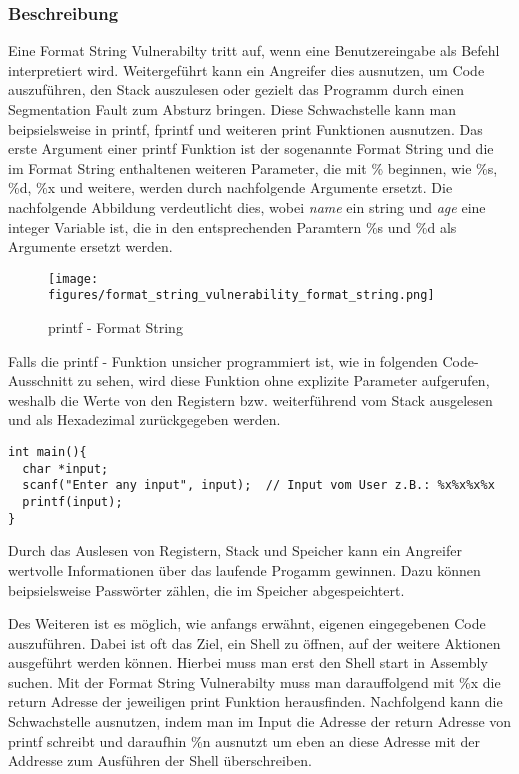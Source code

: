 \documentclass[a4paper,
DIV=13,
12pt,
BCOR=10mm,
department=FakIM,
oneside,
parskip=half,
automark,
listof=totocnumbered,
bibliography=totocnumbered,
acronym=totocnumbered
] {OTHRartcl}
\begin{document}
\subsubsection{Beschreibung}
Eine Format String Vulnerabilty tritt auf, wenn eine Benutzereingabe als Befehl interpretiert wird.
Weitergeführt kann ein Angreifer dies ausnutzen, um Code auszuführen, den Stack auszulesen oder gezielt das Programm durch einen Segmentation Fault zum Absturz bringen.
Diese Schwachstelle kann man beipsielsweise in printf, fprintf und weiteren print Funktionen ausnutzen.
Das erste Argument einer printf Funktion ist der sogenannte Format String und die im Format String enthaltenen weiteren Parameter, die mit \% beginnen, wie \%s, \%d, \%x und weitere, werden durch nachfolgende
Argumente ersetzt. Die nachfolgende Abbildung verdeutlicht dies, wobei \textit{name} ein string und \textit{age} eine integer Variable ist, die in den entsprechenden
Paramtern \%s und \%d als Argumente ersetzt werden.
\begin{figure}[ht!]
  \begin{center}
    \texttt{[image: figures/format\_string\_vulnerability\_format\_string.png]}
    \caption{printf - Format String}
    \label{Abbildung 1: printf - Format String}
  \end{center}
\end{figure}

Falls die printf - Funktion unsicher programmiert ist, wie in folgenden Code-Ausschnitt zu sehen,
wird diese Funktion ohne explizite Parameter aufgerufen, weshalb die Werte von den Registern bzw. weiterführend vom Stack ausgelesen und als Hexadezimal zurückgegeben werden.
\begin{verbatim}
int main(){
  char *input;
  scanf("Enter any input", input);  // Input vom User z.B.: %x%x%x%x
  printf(input);
}
\end{verbatim}
Durch das Auslesen von Registern, Stack und Speicher kann ein Angreifer wertvolle Informationen über das laufende Progamm gewinnen.
Dazu können beipsielsweise Passwörter zählen, die im Speicher abgespeichtert.


Des Weiteren ist es möglich, wie anfangs erwähnt, eigenen eingegebenen Code auszuführen. Dabei ist oft das Ziel,
ein Shell zu öffnen, auf der weitere Aktionen ausgeführt werden können.
Hierbei muss man erst den Shell start in Assembly suchen. Mit der Format String Vulnerabilty muss man darauffolgend mit \%x die return Adresse
der jeweiligen print Funktion herausfinden. Nachfolgend kann die Schwachstelle ausnutzen, indem man im Input die Adresse der return Adresse von printf schreibt
und daraufhin \%n ausnutzt um eben an diese Adresse mit der Addresse zum Ausführen der Shell überschreiben.
\end{document}
